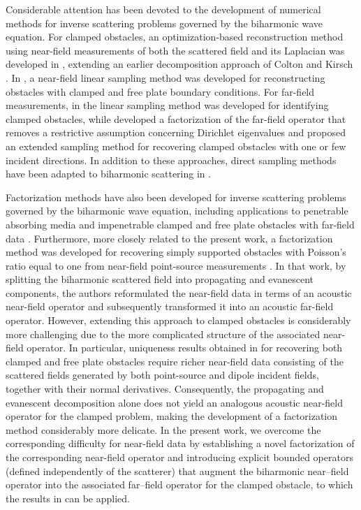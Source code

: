 \documentclass{article}
\begin{document}
Considerable attention has been devoted to the development of numerical methods for inverse scattering problems governed by the biharmonic wave equation. For clamped obstacles, an optimization-based reconstruction method using near-field measurements of both the scattered field and its Laplacian was developed in \cite{ChangGuo2023}, extending an earlier decomposition approach of Colton and Kirsch \cite{ColtonKress2019}. In \cite{BourgeoisRecoquillay2020}, a near-field linear sampling method was developed for reconstructing obstacles with clamped and free plate boundary conditions. For far-field measurements, in \cite{Guo2024} the linear sampling method was developed for identifying clamped obstacles, while \cite{HarrisLiOzochiawaeze2026} developed a factorization of the far-field operator that removes a restrictive assumption concerning Dirichlet eigenvalues and proposed an extended sampling method for recovering clamped obstacles with one or few incident directions. In addition to these approaches, direct sampling methods have been adapted to biharmonic scattering in \cite{HarrisLeeLi2025, ZhuGe2025}.

Factorization methods have also been developed for inverse scattering problems governed by the biharmonic wave equation, including applications to penetrable absorbing media \cite{CejaAyalaHarrisOzochiawaeze2026} and impenetrable clamped and free plate obstacles with far-field data \cite{Zhu2026}. Furthermore, more closely related to the present work, a factorization method was developed for recovering simply supported obstacles with Poisson's ratio equal to one from near-field point-source measurements \cite{HarrisKleefeld2026}. In that work, by splitting the biharmonic scattered field into propagating and evanescent components, the authors reformulated the near-field data in terms of an acoustic near-field operator and subsequently transformed it into an acoustic far-field operator. However, extending this approach to clamped obstacles is considerably more challenging due to the more complicated structure of the associated near-field operator. In particular, uniqueness results obtained in \cite{BourgeoisRecoquillay2020} for recovering both clamped and free plate obstacles require richer near-field data consisting of the scattered fields generated by both point-source and dipole incident fields, together with their normal derivatives. Consequently, the propagating and evanescent decomposition alone does not yield an analogous acoustic near-field operator for the clamped problem, making the development of a factorization method considerably more delicate. In the present work, we overcome the corresponding difficulty for near-field data by establishing a novel factorization of the corresponding near-field operator and introducing explicit bounded operators (defined independently of the scatterer) that augment the biharmonic near–field operator into the associated far–field operator for the clamped obstacle, to which the results in \cite{Zhu2026} can be applied.
\end{document}
